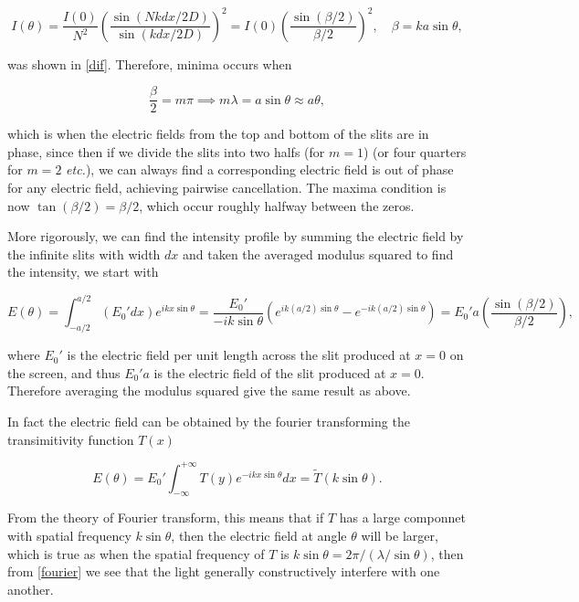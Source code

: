 \documentclass[english,a4paper,12pt]{report}
\begin{document}
\begin{equation}
    I(\theta ) =  \frac{I(0)}{N^2}  \left( \frac{\sin \left( Nkdx /2D  \right)}{\sin \left( kdx /2D  \right)}  \right)^2 = I(0) \left( \frac{\sin \left( \beta /2  \right)}{\beta /2 }  \right)^2, \quad \beta  = ka\sin \theta , \label{diffraction} 
\end{equation}

was shown in \cref{dif}. Therefore, minima occurs when

\begin{equation}
    \frac{\beta }{2} = m\pi \implies m\lambda = a\sin \theta \approx a \theta , \label{difmin} 
\end{equation}

which is when the electric fields from the top and bottom of the slits are in phase, since then if we divide the slits into two halfs (for \(m=1\)) (or four quarters for \(m=2\) \textit{etc.}), we can always find a corresponding electric field is out of phase for any electric field, achieving pairwise cancellation. The maxima condition is now \(\tan (\beta /2) = \beta /2\), which occur roughly halfway between the zeros. 

More rigorously, we can find the intensity profile by summing the electric field by the infinite slits with width \(dx\) and taken the averaged modulus squared to find the intensity, we start with 

\begin{equation}
    E(\theta ) = \int_{-a /2 }^{a /2 } (E_0 ' dx ) e^{ikx\sin \theta } = \frac{E_0 '}{-ik\sin \theta }\left( e^{ik(a /2)\sin \theta }- e^{-ik(a /2)\sin \theta }   \right) = E_0 'a \left( \frac{\sin \left( \beta /2 \right)}{\beta /2 }  \right), 
\end{equation}

where \(E_0 '\) is the electric field per unit length across the slit produced at \(x=0\) on the screen, and thus \(E_0 'a\) is the electric field of the slit produced at \(x = 0\). Therefore averaging the modulus squared give the same result as above.

In fact the electric field can be obtained by the fourier transforming the transimitivity function \(T(x)\)

\begin{equation}
    E(\theta) = E_0 ' \int_{-\infty}^{+\infty} T(y)e^{-ikx\sin \theta }dx = \tilde{T}(k\sin \theta ).   
\end{equation}

From the theory of Fourier transform, this means that if \(T\) has a large componnet with spatial frequency \(k\sin \theta \), then the electric field at angle \(\theta \) will be larger, which is true as when the spatial frequency of \(T\) is \(k\sin \theta = 2\pi /(\lambda /\sin \theta )\), then from \cref{fourier} we see that the light generally constructively interfere with one another.   
\end{document}
